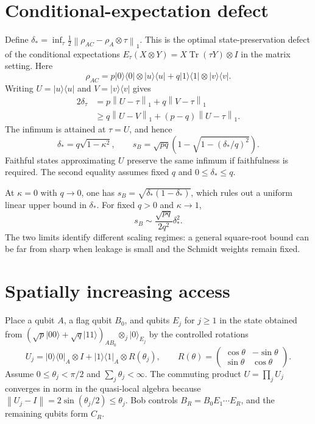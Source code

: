 \documentclass[11pt,a4paper]{article}
\theoremstyle{definition}
\theoremstyle{plain}
\DeclareMathOperator{\Tr}{Tr}
\newcommand{\ket}[1]{\lvert#1\rangle}
\newcommand{\bra}[1]{\langle#1\rvert}
\newcommand{\norm}[1]{\left\lVert#1\right\rVert}
\begin{document}
\section{Conditional-expectation defect}
Define $\delta_*=\inf_\tau\frac12\norm{\rho_{AC}-\rho_A\otimes\tau}_1$.
This is the optimal state-preservation defect of the conditional expectations
$E_\tau(X\otimes Y)=X\Tr(\tau Y)\otimes I$ in the matrix setting. Here
\[
\rho_{AC}=p\ket0\bra0\otimes\ket u\bra u
+q\ket1\bra1\otimes\ket v\bra v.
\]
Writing $U=\ket u\bra u$ and $V=\ket v\bra v$ gives
\begin{align*}
2\delta_\tau&=p\norm{U-\tau}_1+q\norm{V-\tau}_1\\
&\geq q\norm{U-V}_1+(p-q)\norm{U-\tau}_1.
\end{align*}
The infimum is attained at $\tau=U$, and hence
\begin{equation}\label{delta}
\boxed{\delta_*=q\sqrt{1-\kappa^2},\qquad
s_B=\sqrt{pq}\left(1-\sqrt{1-(\delta_*/q)^2}\right).}
\end{equation}
Faithful states approximating $U$ preserve the same infimum if faithfulness
is required. The second equality assumes fixed $q$ and
$0\leq\delta_*\leq q$.

At $\kappa=0$ with $q\to0$, one has
$s_B=\sqrt{\delta_*(1-\delta_*)}$, which rules out a uniform linear upper
bound in $\delta_*$. For fixed $q>0$ and $\kappa\to1$,
\[
s_B\sim\frac{\sqrt{pq}}{2q^2}\delta_*^2.
\]
The two limits identify different scaling regimes: a general square-root
bound can be far from sharp when leakage is small and the Schmidt weights
remain fixed.

\section{Spatially increasing access}
Place a qubit $A$, a flag qubit $B_0$, and qubits $E_j$ for $j\geq1$ in the
state obtained from
$(\sqrt p\ket{00}+\sqrt q\ket{11})_{AB_0}\otimes_j\ket0_{E_j}$ by the
controlled rotations
\[
U_j=\ket0\bra0_A\otimes I+\ket1\bra1_A\otimes R(\theta_j),
\qquad
R(\theta)=\begin{pmatrix}\cos\theta&-\sin\theta\\
\sin\theta&\cos\theta\end{pmatrix}.
\]
Assume $0\leq\theta_j<\pi/2$ and $\sum_j\theta_j<\infty$. The commuting
product $U=\prod_jU_j$ converges in norm in the quasi-local algebra because
$\norm{U_j-I}=2\sin(\theta_j/2)\leq\theta_j$. Bob controls
$B_R=B_0E_1\cdots E_R$, and the remaining qubits form $C_R$.
\end{document}

